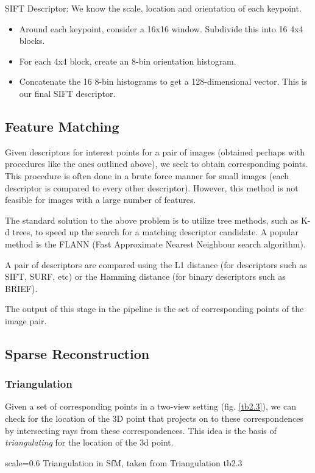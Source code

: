 SIFT Descriptor: We know the scale, location and orientation of each keypoint. 
\begin{itemize}
	\item Around each keypoint, consider a 16x16 window. Subdivide this into 16 4x4 blocks.
	\item For each 4x4 block, create an 8-bin orientation histogram. 
	\item Concatenate the 16 8-bin histograms to get a 128-dimensional vector. This is our final SIFT descriptor. 
\end{itemize}

\subsection{Feature Matching}
Given descriptors for interest points for a pair of images (obtained perhaps with procedures like the ones outlined above), we seek to obtain corresponding points. This procedure is often done in a brute force manner for small images (each descriptor is compared to every other descriptor). However, this method is not feasible for images with a large number of features.

The standard solution to the above problem is to utilize tree methods, such as K-d trees, to speed up the search for a matching descriptor candidate. A popular method is the FLANN (Fast Approximate Nearest Neighbour search algorithm).

A pair of descriptors are compared using the L1 distance (for descriptors such as SIFT, SURF, etc) or the Hamming distance (for binary descriptors such as BRIEF).

The output of this stage in the pipeline is the set of corresponding points of the image pair. 

\subsection{Sparse Reconstruction}
\subsubsection{Triangulation}
Given a set of corresponding points in a two-view setting (fig. \ref{tb2.3}), we can check for the location of the 3D point that projects on to these correspondences by intersecting rays from these correspondences. This idea is the basis of \emph{triangulating} for the location of the 3d point.

{scale=0.6}%
{Triangulation in SfM, taken from \cite{schoenberger2018}}%
{Triangulation}%
{tb2.3}


